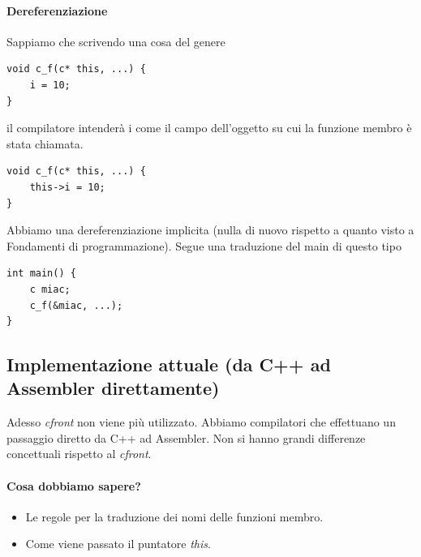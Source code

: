 \documentclass[11pt]{report}
\theoremstyle{definition}
\begin{document}
\paragraph{Dereferenziazione} Sappiamo che scrivendo una cosa del genere
\begin{verbatim}
void c_f(c* this, ...) {
    i = 10;
}
\end{verbatim}
il compilatore intenderà i come il campo dell'oggetto su cui la funzione membro è stata chiamata. 
\begin{verbatim}
void c_f(c* this, ...) {
    this->i = 10;
}
\end{verbatim}
Abbiamo una dereferenziazione implicita (nulla di nuovo rispetto a quanto visto a Fondamenti di programmazione). Segue una traduzione del main di questo tipo
\begin{verbatim}
int main() {
    c miac;
    c_f(&miac, ...);
}
\end{verbatim}
\clearpage

\subsection{Implementazione attuale (da C++ ad Assembler direttamente)}
Adesso \emph{cfront} non viene più utilizzato. Abbiamo compilatori che effettuano un passaggio diretto da C++ ad Assembler. Non si hanno grandi differenze concettuali rispetto al \emph{cfront}. 
\paragraph{Cosa dobbiamo sapere?}
\begin{itemize}
\item Le regole per la traduzione dei nomi delle funzioni membro.
\item Come viene passato il puntatore \emph{this}.
\end{itemize}
\end{document}

